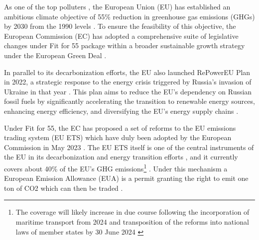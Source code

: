\documentclass[preprint, 3p,
authoryear]{elsarticle} %
\begin{document}
As one of the top polluters \citep{unep_emissions_2023}, the European
Union (EU) has established an ambitious climate objective of 55\%
reduction in greenhouse gas emissions (GHGs) by 2030 from the 1990
levels \citep[Art 4(1)]{regulation_2021_1119}. To ensure the feasibility
of this objective, the European Commission (EC) has adopted a
comprehensive suite of legislative changes under Fit for 55 package
within a broader sustainable growth strategy under the European Green
Deal \citep{delivering_2021}.

In parallel to its decarbonization efforts, the EU also launched
RePowerEU Plan in 2022, a strategic response to the energy crisis
triggered by Russia's invasion of Ukraine in that year
\citep{communication_2022}. This plan aims to reduce the EU's dependency
on Russian fossil fuels by significantly accelerating the transition to
renewable energy sources, enhancing energy efficiency, and diversifying
the EU's energy supply chains \citep[1-5]{communication_2022}.

Under Fit for 55, the EC has proposed a set of reforms to the EU
emissions trading system (EU ETS) which have duly been adopted by the
European Commission in May 2023 \citep{directive_2023_959}. The EU ETS
itself is one of the central instruments of the EU in its
decarbonization and energy transition efforts
\citep{decision_2015_1814, bai_drivers_2023}, and it currently covers
about 40\% of the EU's GHG
emissions\footnote{The coverage will likely increase in due course following the incorporation of maritime transport from 2024 and transposition of the reforms into national laws of member states by 30 June 2024 \citep{directive_2023_959}}
\citep{eu_ets}. Under this mechanism a European Emission Allowance (EUA)
is a permit granting the right to emit one ton of CO2 which can then be
traded \citep{directive_2003_87}.
\end{document}
